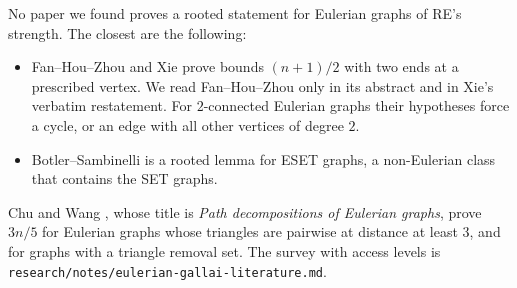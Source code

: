 \documentclass[11pt]{amsart}
\theoremstyle{definition}
\begin{document}
No paper we found proves a rooted statement for Eulerian graphs of RE's strength. The closest are
the following:
\begin{itemize}[leftmargin=*]
\item Fan--Hou--Zhou \cite[Thm.~5]{FHZ} and Xie \cite[Thm.~1.4]{Xie} prove bounds $(n+1)/2$ with
two ends at a prescribed vertex. We read Fan--Hou--Zhou only in its abstract and in Xie's verbatim
restatement.
For $2$-connected Eulerian graphs their hypotheses force a cycle, or an edge with all other vertices of
degree $2$.
\item Botler--Sambinelli \cite[Lemma~10]{BS} is a rooted lemma for ESET graphs, a non-Eulerian class
that contains the SET graphs.
\end{itemize}
Chu and Wang \cite{CW}, whose title is \emph{Path decompositions of Eulerian graphs}, prove $3n/5$ for
Eulerian graphs whose triangles are pairwise at distance at least $3$, and for graphs with a triangle
removal set. The survey with access levels is \texttt{research/notes/eulerian-gallai-literature.md}.
\end{document}
